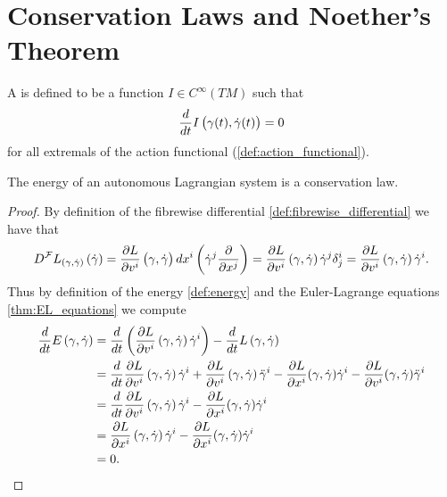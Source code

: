 \section*{Conservation Laws and Noether's Theorem}

\begin{definition}
	A  is defined to be a function $I \in C^\infty(TM)$ such that
	\begin{equation*}
		\frac{d}{dt}I\del[1]{\gamma(t),\dot{\gamma}(t)} = 0
	\end{equation*}
	\noindent for all extremals of the action functional \textup{(\ref{def:action_functional})}.
\end{definition}

\begin{proposition}
	The energy of an autonomous Lagrangian system is a conservation law.	
\end{proposition}

\begin{proof}
	By definition of the fibrewise differential \ref{def:fibrewise_differential} we have that
	\begin{equation*}
		D^\mathcal{F}L_{(\gamma,\dot{\gamma})}\del[0]{\dot{\gamma}} = \frac{\partial L}{\partial v^i}\del[1]{\gamma,\dot{\gamma}}dx^i\del[3]{\dot{\gamma}^j\frac{\partial}{\partial x^j}}
		= \frac{\partial L}{\partial v^i}\del[0]{\gamma,\dot{\gamma}} \dot{\gamma}^j\delta^i_j
		= \frac{\partial L}{\partial v^i}\del[0]{\gamma,\dot{\gamma}} \dot{\gamma}^i.
	\end{equation*}
	Thus by definition of the energy \ref{def:energy} and the Euler-Lagrange equations \ref{thm:EL_equations} we compute
	\begin{align*}
		\frac{d}{dt}E\del[0]{\gamma,\dot{\gamma}} &= \frac{d}{dt}\del[3]{\frac{\partial L}{\partial v^i}\del[0]{\gamma,\dot{\gamma}} \dot{\gamma}^i} - \frac{d}{dt}L\del[0]{\gamma,\dot{\gamma}}\\
		&= \frac{d}{dt}\frac{\partial L}{\partial v^i}\del[0]{\gamma,\dot{\gamma}} \dot{\gamma}^i + \frac{\partial L}{\partial v^i}\del[0]{\gamma,\dot{\gamma}} \ddot{\gamma}^i - \frac{\partial L}{\partial x^i}(\gamma,\dot{\gamma})\dot{\gamma}^i - \frac{\partial L}{\partial v^i}(\gamma,\dot{\gamma})\ddot{\gamma}^i\\
		&= \frac{d}{dt}\frac{\partial L}{\partial v^i}\del[0]{\gamma,\dot{\gamma}} \dot{\gamma}^i - \frac{\partial L}{\partial x^i}(\gamma,\dot{\gamma})\dot{\gamma}^i\\
		&= \frac{\partial L}{\partial x^i}\del[0]{\gamma,\dot{\gamma}} \dot{\gamma}^i - \frac{\partial L}{\partial x^i}(\gamma,\dot{\gamma})\dot{\gamma}^i\\
		&= 0. 
	\end{align*}
\end{proof}

